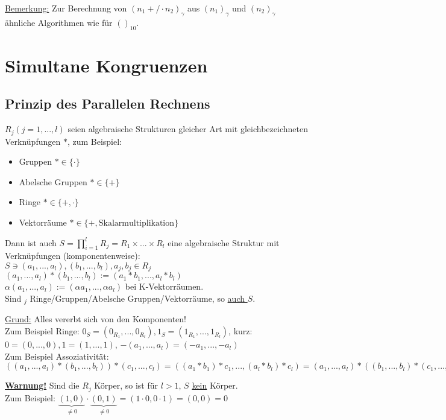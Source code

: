 \documentclass[a4paper,twoside,DIV15,BCOR12mm]{scrbook}
\begin{document}
\underline{Bemerkung:} Zur Berechnung von $(n_1 +/\cdot n_2)_\gamma$
aus $(n_1)_\gamma$ und $(n_2)_\gamma$ ähnliche Algorithmen wie für
$()_{10}$.

\section{Simultane Kongruenzen}

\subsection{Prinzip des Parallelen Rechnens}

$R_j (j = 1,..., l)$ seien algebraische Strukturen gleicher Art mit
gleichbezeichneten Verknüpfungen $\ast$, zum Beispiel:
\begin{itemize}
    \item[] Gruppen $\ast \in \{\cdot\}$
    \item[] Abelsche Gruppen $\ast \in \{+\}$
    \item[] Ringe $\ast \in \{+, \cdot\}$
    \item[] Vektorräume $\ast \in \{+, \text{Skalarmultiplikation}\}$
\end{itemize}

Dann ist auch $S = \prod_{i=1}^lR_j = R_1 \times ... \times R_l$ eine algebraische Struktur mit Verknüpfungen (komponentenweise):\\
$S \ni (a_1,...,a_l), (b_1,...,b_l), a_j, b_j \in R_j$\\
$(a_1, ...,a_l) \ast (b_1,...,b_l) := (a_1 \ast b_1, ..., a_l \ast b_l)$\\
$\alpha(a_1, ..., a_l) := (\alpha a_1, ..., \alpha a_l)$ bei K-Vektorräumen.\\
Sind $_j$ Ringe/Gruppen/Abelsche Gruppen/Vektorräume, so
\underline{auch $S$}.

\underline{Grund:} Alles vererbt sich von den Komponenten!\\
Zum Beispiel Ringe: $0_S = (0_{R_1}, ..., 0_{R_l}), 1_S = (1_{R_1}, ..., 1_{R_l})$, kurz: $0 = (0,...,0), 1 = (1,...,1)$, $-(a_1,...,a_l) = (-a_1, ..., -a_l)$\\
Zum Beispiel Assoziativität:\\
$((a_1,...,a_l) \ast (b_1,...,b_l)) \ast (c_1,...,c_l) = ((a_1 \ast
b_1) \ast c_1, ..., (a_l \ast b_l) \ast c_l) = (a_1, ..., a_l) \ast
((b_1, ..., b_l) \ast (c_1, ..., c_l))$

\underline{\textbf{Warnung!}} Sind die $R_j$ Körper, so ist für $l > 1$, $S$ \underline{kein} Körper.\\
Zum Beispiel: $\underbrace{(1,0)}_{\not= 0} \cdot
\underbrace{(0,1)}_{\not= 0} = (1 \cdot 0, 0 \cdot 1) = (0, 0) = 0$
\end{document}
